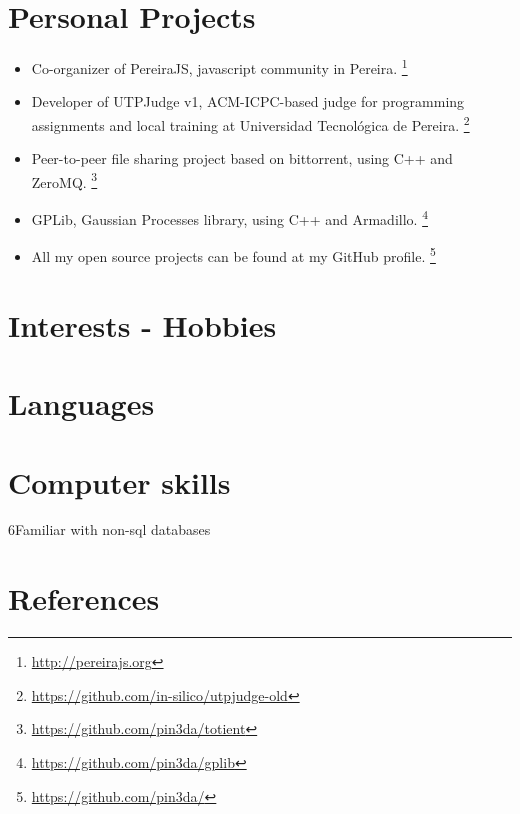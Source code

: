 \documentclass[11pt,a4paper,sans]{moderncv}        %
\newcommand{\urlfootnote}[1]{\footnote{\href{#1}{#1}}}
\begin{document}
\section{Personal Projects}

\begin{itemize}
  \item Co-organizer of PereiraJS, javascript community in Pereira. \urlfootnote{http://pereirajs.org}
  \item Developer of UTPJudge v1, ACM-ICPC-based judge for programming assignments and local training at Universidad Tecnológica de Pereira. \urlfootnote{https://github.com/in-silico/utpjudge-old}
  \item Peer-to-peer file sharing project based on bittorrent, using C++ and ZeroMQ. \urlfootnote{https://github.com/pin3da/totient}
  \item GPLib, Gaussian Processes library, using C++ and Armadillo. \urlfootnote{https://github.com/pin3da/gplib}
  \item All my open source projects can be found at my GitHub profile. \urlfootnote{https://github.com/pin3da/}
\end{itemize}


\section{Interests - Hobbies}

\section{Languages}

\section{Computer skills}
 {6}{Familiar with non-sql databases}

\section{References}
\begin{cvcolumns}

\end{cvcolumns}
\end{document}
